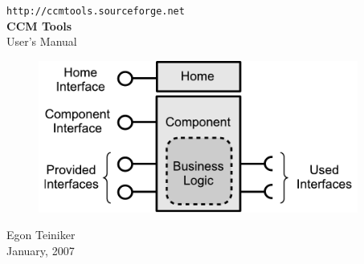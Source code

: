 \begin{titlepage}
\begin{center}

  	\vspace*{3cm}
  	{\LARGE \tt http://ccmtools.sourceforge.net} \\

  	\vspace{2cm}
  	{\huge \bf CCM Tools} \\

  	\vspace{10mm}
  	{\huge User's Manual} 

  	\vspace{15mm}
	\begin{figure}[htbp]
		\begin{center}
			\includegraphics[height=5cm,angle=0] {figures/CcmtoolsComponent}
	  	\end{center}
	\end{figure}
  	
  	\vspace{1cm}
  	{\LARGE Egon Teiniker} \\
  	
  	\vspace{15mm}
  	{\large January, 2007} 

\end{center}
\end{titlepage}